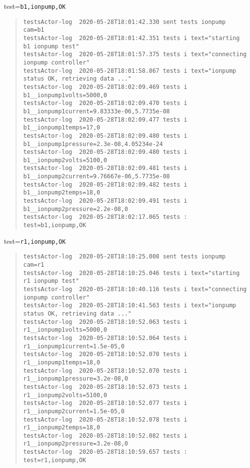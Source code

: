 test=\texttt{b1,ionpump,OK}

\begin{quote}
\begin{tiny}
\begin{verbatim}
testsActor-log  2020-05-28T18:01:42.330 sent tests ionpump cam=b1
testsActor-log  2020-05-28T18:01:42.351 tests i text="starting b1 ionpump test"
testsActor-log  2020-05-28T18:01:57.375 tests i text="connecting ionpump controller"
testsActor-log  2020-05-28T18:01:58.867 tests i text="ionpump status OK, retrieving data ..."
testsActor-log  2020-05-28T18:02:09.469 tests i b1__ionpump1volts=5000,0
testsActor-log  2020-05-28T18:02:09.470 tests i b1__ionpump1current=9.83333e-06,5.7735e-08
testsActor-log  2020-05-28T18:02:09.477 tests i b1__ionpump1temps=17,0
testsActor-log  2020-05-28T18:02:09.480 tests i b1__ionpump1pressure=2.3e-08,4.05234e-24
testsActor-log  2020-05-28T18:02:09.480 tests i b1__ionpump2volts=5100,0
testsActor-log  2020-05-28T18:02:09.481 tests i b1__ionpump2current=9.76667e-06,5.7735e-08
testsActor-log  2020-05-28T18:02:09.482 tests i b1__ionpump2temps=18,0
testsActor-log  2020-05-28T18:02:09.491 tests i b1__ionpump2pressure=2.2e-08,0
testsActor-log  2020-05-28T18:02:17.065 tests : test=b1,ionpump,OK

\end{verbatim}
\end{tiny}
\end{quote}

\noindent test=\texttt{r1,ionpump,OK}

\begin{quote}
\begin{tiny}
\begin{verbatim}
testsActor-log  2020-05-28T18:10:25.008 sent tests ionpump cam=r1
testsActor-log  2020-05-28T18:10:25.046 tests i text="starting r1 ionpump test"
testsActor-log  2020-05-28T18:10:40.116 tests i text="connecting ionpump controller"
testsActor-log  2020-05-28T18:10:41.563 tests i text="ionpump status OK, retrieving data ..."
testsActor-log  2020-05-28T18:10:52.063 tests i r1__ionpump1volts=5000,0
testsActor-log  2020-05-28T18:10:52.064 tests i r1__ionpump1current=1.5e-05,0
testsActor-log  2020-05-28T18:10:52.070 tests i r1__ionpump1temps=18,0
testsActor-log  2020-05-28T18:10:52.070 tests i r1__ionpump1pressure=3.2e-08,0
testsActor-log  2020-05-28T18:10:52.073 tests i r1__ionpump2volts=5100,0
testsActor-log  2020-05-28T18:10:52.077 tests i r1__ionpump2current=1.5e-05,0
testsActor-log  2020-05-28T18:10:52.078 tests i r1__ionpump2temps=18,0
testsActor-log  2020-05-28T18:10:52.082 tests i r1__ionpump2pressure=3.2e-08,0
testsActor-log  2020-05-28T18:10:59.657 tests : test=r1,ionpump,OK
\end{verbatim}
\end{tiny}
\end{quote}

